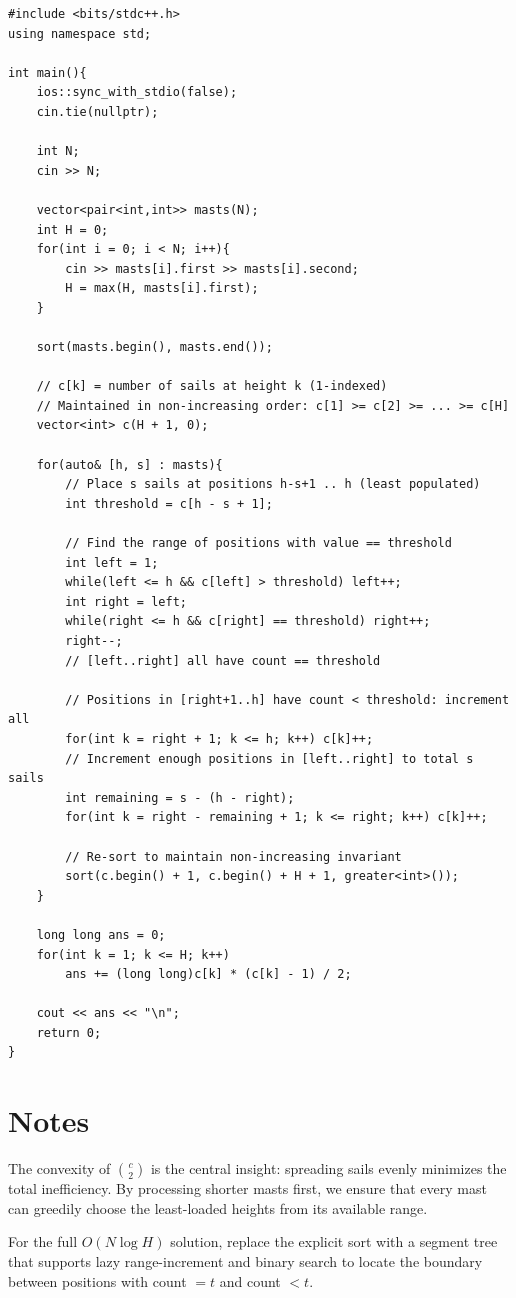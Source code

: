 \documentclass[11pt,a4paper]{article}
\begin{document}
\begin{lstlisting}
#include <bits/stdc++.h>
using namespace std;

int main(){
    ios::sync_with_stdio(false);
    cin.tie(nullptr);

    int N;
    cin >> N;

    vector<pair<int,int>> masts(N);
    int H = 0;
    for(int i = 0; i < N; i++){
        cin >> masts[i].first >> masts[i].second;
        H = max(H, masts[i].first);
    }

    sort(masts.begin(), masts.end());

    // c[k] = number of sails at height k (1-indexed)
    // Maintained in non-increasing order: c[1] >= c[2] >= ... >= c[H]
    vector<int> c(H + 1, 0);

    for(auto& [h, s] : masts){
        // Place s sails at positions h-s+1 .. h (least populated)
        int threshold = c[h - s + 1];

        // Find the range of positions with value == threshold
        int left = 1;
        while(left <= h && c[left] > threshold) left++;
        int right = left;
        while(right <= h && c[right] == threshold) right++;
        right--;
        // [left..right] all have count == threshold

        // Positions in [right+1..h] have count < threshold: increment all
        for(int k = right + 1; k <= h; k++) c[k]++;
        // Increment enough positions in [left..right] to total s sails
        int remaining = s - (h - right);
        for(int k = right - remaining + 1; k <= right; k++) c[k]++;

        // Re-sort to maintain non-increasing invariant
        sort(c.begin() + 1, c.begin() + H + 1, greater<int>());
    }

    long long ans = 0;
    for(int k = 1; k <= H; k++)
        ans += (long long)c[k] * (c[k] - 1) / 2;

    cout << ans << "\n";
    return 0;
}
\end{lstlisting}

\section{Notes}
The convexity of $\binom{c}{2}$ is the central insight: spreading sails evenly minimizes the total inefficiency. By processing shorter masts first, we ensure that every mast can greedily choose the least-loaded heights from its available range.

For the full $O(N \log H)$ solution, replace the explicit sort with a segment tree that supports lazy range-increment and binary search to locate the boundary between positions with count $= t$ and count $< t$.
\end{document}

